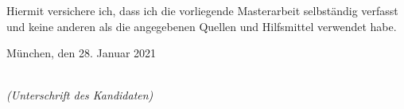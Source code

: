 %
%
%
%

\newpage

\thispagestyle{empty}

\begin{large}

\vspace*{2cm}

\noindent
Hiermit versichere ich, dass ich die vorliegende Masterarbeit
selbständig verfasst und keine anderen als die angegebenen Quellen
und Hilfsmittel verwendet habe.

\vspace{2cm}

\noindent
München, den 28. Januar 2021

\vspace{3cm}

\hspace*{7cm}%
\dotfill\\
\hspace*{8.5cm}%
\textit{(Unterschrift des Kandidaten)}

\end{large}

